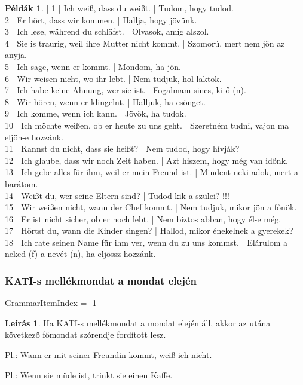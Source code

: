 \documentclass{article}
\theoremstyle{definition}
\newtheorem*{exmp}{Példák}
\newtheorem*{desc}{Leírás}
\begin{document}
\begin{exmp} | %
1 | Ich weiß, dass du weißt. | Tudom, hogy tudod.\\
2 | Er hört, dass wir kommen. | Hallja, hogy jövünk.\\
3 | Ich lese, während du schläfst. | Olvasok, amíg alszol.\\
4 | Sie is traurig, weil ihre Mutter nicht kommt. | Szomorú, mert nem jön az anyja.\\
5 | Ich sage, wenn er kommt. | Mondom, ha jön.\\
6 | Wir weisen nicht, wo ihr lebt. | Nem tudjuk, hol laktok.\\
7 | Ich habe keine Ahnung, wer sie ist. | Fogalmam sincs, ki ő (n).\\
8 | Wir hören, wenn er klingelnt. | Halljuk, ha csönget.\\
9 | Ich komme, wenn ich kann. | Jövök, ha tudok.\\
10 | Ich möchte weißen, ob er heute zu uns geht. | Szeretném tudni, vajon ma eljön-e hozzánk.\\
11 | Kannst du nicht, dass sie heißt? | Nem tudod, hogy hívják?\\
12 | Ich glaube, dass wir noch Zeit haben. | Azt hiszem, hogy még van időnk.\\
13 | Ich gebe alles für ihm, weil er mein Freund ist. | Mindent neki adok, mert a barátom.\\
14 | Weißt du, wer seine Eltern sind? | Tudod kik a szülei? !!!\\
15 | Wir weißen nicht, wann der Chef kommt. | Nem tudjuk, mikor jön a főnök.\\
16 | Er ist nicht sicher, ob er noch lebt. | Nem biztos abban, hogy él-e még.\\
17 | Hörtst du, wann die Kinder singen? | Hallod, mikor énekelnek a gyerekek?\\
18 | Ich rate seinen Name für ihm ver, wenn du zu uns kommst. | Elárulom a neked (f) a nevét (n), ha eljössz hozzánk.\\
\end{exmp}

\subsubsection{KATI-s mellékmondat a mondat elején}

GrammarItemIndex = -1

\begin{desc}
Ha KATI-s mellékmondat a mondat elején áll, akkor az utána következő főmondat szórendje fordított lesz.

Pl.: Wann er mit seiner Freundin kommt, weiß ich nicht.

Pl.: Wenn sie müde ist, trinkt sie einen Kaffe.
\end{desc}
\end{document}
